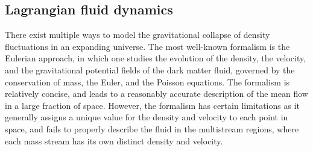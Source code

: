 \documentclass[a4paper, 11pt]{article}
\begin{document}
\subsection{Lagrangian fluid dynamics}
There exist multiple ways to model the gravitational collapse of density fluctuations in an expanding universe. The most well-known formalism is the Eulerian approach, in which one studies the evolution of the density, the velocity, and the gravitational potential fields of the dark matter fluid, governed by the conservation of mass, the Euler, and the Poisson equations. The formalism is relatively concise, and leads to a reasonably accurate description of the mean flow in a large fraction of space. However, the formalism has certain limitations as it generally assigns a unique value for the density and velocity to each point in space, and fails to properly describe the fluid in the multistream regions, where each mass stream has its own distinct density and velocity.
\end{document}
